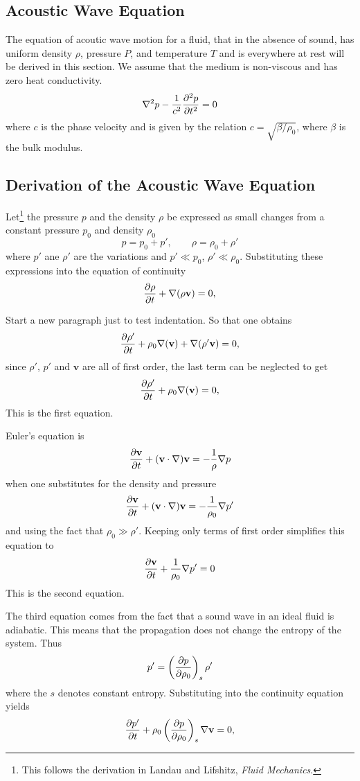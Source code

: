 \documentclass{article}
\begin{document}
\subsection{Acoustic Wave Equation}

The equation of acoutic wave motion for a fluid, that in the absence of sound,
has uniform density $\rho$, pressure $P$, and temperature $T$ and is everywhere
at rest will be derived in this section.  We assume that the medium is non-viscous
and has zero heat conductivity.  
$$
\nabla^2p-\frac{1}{c^2} {\partial^2 p \over \partial t^2} = 0
\label{eqn:lineareuler}
$$
where $c$ is the phase velocity and is given by the relation $c= \sqrt{\beta/\rho_0}$, where $\beta$ is the
bulk modulus.

\subsection{Derivation of the Acoustic Wave Equation}

Let\footnote{This follows the derivation in Landau and Lifshitz, \textit{Fluid Mechanics}.}
the pressure $p$ and the density $\rho$ be expressed as small changes
from a constant pressure $p_0$ and density $\rho_0$
$$
p = p_0 + p', \qquad \rho = \rho_0 + \rho'
$$
where $p'$ ane $\rho'$ are the variations and $p'\ll p_0$, $\rho'\ll\rho_0$.
Substituting these expressions into the equation of continuity
$$
{\partial \rho\over\partial t} + \nabla(\rho \mathbf{v}) = 0,
$$

Start a new paragraph just to test indentation.  So that one obtains
$$
{\partial \rho'\over\partial t} + \rho_0\nabla(\mathbf{v}) + \nabla(\rho'\mathbf{v}) = 0,
$$
since $\rho'$, $p'$ and $\mathbf{v}$ are all of first order, the last term can
be neglected to get
$$
{\partial \rho'\over\partial t} + \rho_0\nabla(\mathbf{v}) = 0,
$$
This is the first equation.

Euler's equation is
$$
{\partial\mathbf{v}\over\partial t} + (\mathbf{v} \cdot \nabla)\mathbf{v} = -{1\over\rho} \nabla p
$$
when one substitutes for the density and pressure
$$
{\partial\mathbf{v}\over\partial t} + (\mathbf{v} \cdot \nabla)\mathbf{v} = -{1\over\rho_0} \nabla p'
$$
and using the fact that $\rho_0\gg\rho'$.  Keeping only terms of first order
simplifies this equation to
$$
{\partial\mathbf{v}\over\partial t} + {1\over\rho_0} \nabla p'=0
$$
This is the second equation.

The third equation comes from the fact that a sound wave in an ideal
fluid is adiabatic.  This means that the propagation does not change
the entropy of the system.  Thus
$$
p' = \left({\partial p \over \partial \rho_0}\right)_s  \rho'
$$
where the $s$ denotes constant entropy.  Substituting into the continuity equation yields
$$
{\partial p'\over\partial t} + \rho_0\left({\partial p\over \partial \rho_0}\right)_s\nabla\mathbf{v} = 0,
$$
\end{document}
